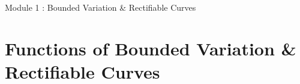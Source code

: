 

\def\upint{\mathchoice%
    {\mkern13mu\overline{\vphantom{\intop}\mkern7mu}\mkern-20mu}%
    {\mkern7mu\overline{\vphantom{\intop}\mkern7mu}\mkern-14mu}%
    {\mkern7mu\overline{\vphantom{\intop}\mkern7mu}\mkern-14mu}%
    {\mkern7mu\overline{\vphantom{\intop}\mkern7mu}\mkern-14mu}%
  \int}
\def\lowint{\mkern3mu\underline{\vphantom{\intop}\mkern7mu}\mkern-10mu\int}

{\Large Module 1 : Bounded Variation \& Rectifiable Curves}
\section{Functions of Bounded Variation \& Rectifiable Curves}
\setcounter{subsection}{1}

